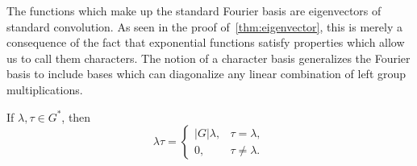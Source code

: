 The functions which make up the standard Fourier basis
are eigenvectors of standard convolution.  
As seen in the proof of~\ref{thm:eigenvector}, 
this is merely a consequence of the fact that
exponential functions satisfy properties which allow us to
call them characters.  The notion of a character basis
generalizes the Fourier basis to include bases which
can diagonalize any linear combination of 
left group multiplications.
\begin{corollary}\label{cor:idemp}
If $\lambda, \tau \in G^*$, then
\begin{equation}
\lambda \tau = 
\begin{cases}  |G|\lambda, & \tau=\lambda,\\
0, & \tau\neq\lambda.
\end{cases}
\end{equation}
\end{corollary}

